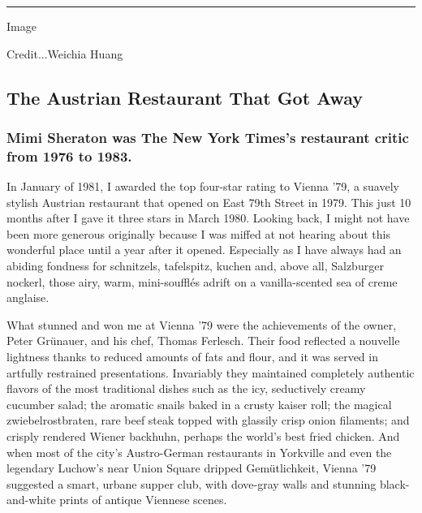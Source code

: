 \begin{center}\rule{0.5\linewidth}{\linethickness}\end{center}

Image

Credit...Weichia Huang

\hypertarget{the-austrian-restaurant-that-got-away}{%
\subsection{The Austrian Restaurant That Got
Away}\label{the-austrian-restaurant-that-got-away}}

\hypertarget{mimi-sheraton-was-the-new-york-timess-restaurant-critic-from-1976-to-1983}{%
\subsubsection{Mimi Sheraton was The New York Times's restaurant critic
from 1976 to
1983.}\label{mimi-sheraton-was-the-new-york-timess-restaurant-critic-from-1976-to-1983}}

In January of 1981, I awarded the top four-star rating to Vienna '79, a
suavely stylish Austrian restaurant that opened on East 79th Street in
1979. This just 10 months after I gave it three stars in March 1980.
Looking back, I might not have been more generous originally because I
was miffed at not hearing about this wonderful place until a year after
it opened. Especially as I have always had an abiding fondness for
schnitzels, tafelspitz, kuchen and, above all, Salzburger nockerl, those
airy, warm, mini-soufflés adrift on a vanilla-scented sea of creme
anglaise.

What stunned and won me at Vienna '79 were the achievements of the
owner, Peter Grünauer, and his chef, Thomas Ferlesch. Their food
reflected a nouvelle lightness thanks to reduced amounts of fats and
flour, and it was served in artfully restrained presentations.
Invariably they maintained completely authentic flavors of the most
traditional dishes such as the icy, seductively creamy cucumber salad;
the aromatic snails baked in a crusty kaiser roll; the magical
zwiebelrostbraten, rare beef steak topped with glassily crisp onion
filaments; and crisply rendered Wiener backhuhn, perhaps the world's
best fried chicken. And when most of the city's Austro-German
restaurants in Yorkville and even the legendary Luchow's near Union
Square dripped Gemütlichkeit, Vienna '79 suggested a smart, urbane
supper club, with dove-gray walls and stunning black-and-white prints of
antique Viennese scenes.

